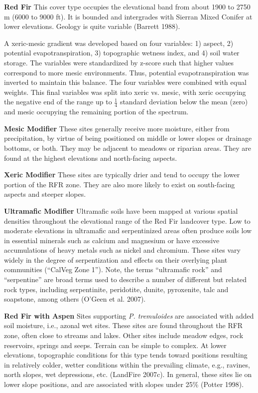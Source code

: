 \textbf{Red Fir} This cover type occupies the elevational band from about 1900 to 2750 m (6000 to 9000 ft). It is bounded and intergrades with Sierran Mixed Conifer at lower elevations. Geology is quite variable (Barrett 1988).

A xeric-mesic gradient was developed based on four variables: 1) aspect, 2) potential evapotranspiration, 3) topographic wetness index, and 4) soil water storage. The variables were standardized by z-score such that higher values correspond to more mesic environments. Thus, potential evapotranspiration was inverted to maintain this balance. The four variables were combined with equal weights. This final variables was split into xeric vs. mesic, with xeric occupying the negative end of the range up to $\frac{1}{4}$ standard deviation below the mean (zero) and mesic occupying the remaining portion of the spectrum.


\begin{adjustwidth}{2cm}{}
\medskip
\noindent \textbf{Mesic Modifier } These sites generally receive more moisture, either from precipitation, by virtue of being positioned on middle or lower slopes or drainage bottoms, or both. They may be adjacent to meadows or riparian areas. They are found at the highest elevations and north-facing aspects.

\medskip
\noindent \textbf{Xeric Modifier} These sites are typically drier and tend to occupy the lower portion of the RFR zone. They are also more likely to exist on south-facing aspects and steeper slopes.

\medskip
\noindent \textbf{Ultramafic Modifier} Ultramafic soils have been mapped at various spatial densities throughout the elevational range of the Red Fir landcover type. Low to moderate elevations in ultramafic and serpentinized areas often produce soils low in essential minerals such as calcium and magnesium or have excessive accumulations of heavy metals such as nickel and chromium. These sites vary widely in the degree of serpentization and effects on their overlying plant communities (``CalVeg Zone 1''). Note, the terms ``ultramafic rock'' and ``serpentine'' are broad terms used to describe a number of different but related rock types, including serpentinite, peridotite, dunite, pyroxenite, talc and soapstone, among others (O'Geen et al. 2007).

\end{adjustwidth}

\noindent \textbf{Red Fir with Aspen} Sites supporting \emph{P. tremuloides} are associated with added soil moisture, i.e., azonal wet sites. These sites are found throughout the RFR zone, often close to streams and lakes. Other sites include meadow edges, rock reservoirs, springs and seeps. Terrain can be simple to complex. At lower elevations, topographic conditions for this type tends toward positions resulting in relatively colder, wetter conditions within the prevailing climate, e.g., ravines, north slopes, wet depressions, etc. (LandFire 2007c). In general, these sites lie on lower slope positions, and are associated with slopes under 25\% (Potter 1998).

